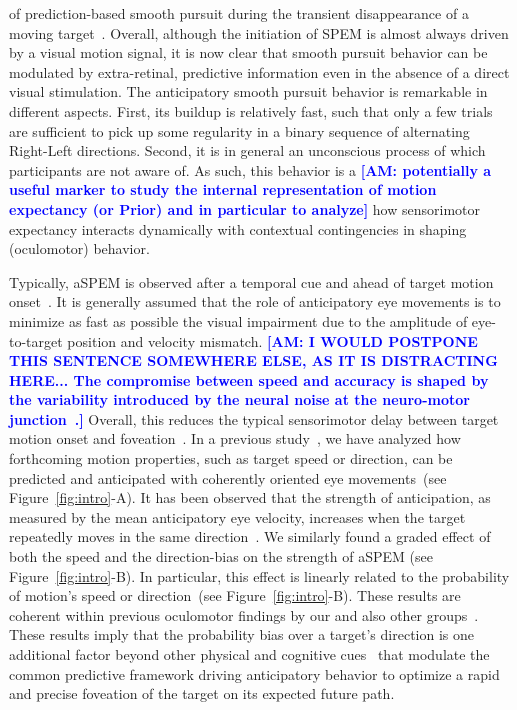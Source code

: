 \documentclass[12pt,english]{article}%
\newcommand{\citep}[1]{\parencite{#1}}
\newcommand{\seeFig}[1]{Figure~\ref{fig:#1}}
\newcommand{\AM}[1]{\textbf{\textcolor{blue}{[AM: #1]}}}
\begin{document}
of prediction-based smooth pursuit during
the transient disappearance of a moving target~\citep{Badler2006,BeckerFuchs1985}.
Overall, although the initiation of SPEM is almost always driven by a visual motion signal, it is now clear that smooth pursuit behavior
can be modulated by extra-retinal, predictive information even in the absence of a direct visual stimulation.
The anticipatory smooth pursuit behavior is remarkable
in different aspects.
First, its buildup is relatively fast, such that only a few trials are sufficient
to pick up some regularity in a binary sequence of alternating Right-Left directions.
Second, it is in general an unconscious process
of which participants are not aware of.
As such, this behavior is a \AM{potentially a useful marker
to study the internal representation of motion expectancy (or Prior) and in particular to analyze} how sensorimotor expectancy interacts dynamically with contextual contingencies in shaping (oculomotor) behavior.

Typically, aSPEM is observed after a temporal cue and
ahead of target motion onset~\citep{Kowler1979a,Kowler1979b, Kowler1984}. %
It is generally assumed that the role of anticipatory eye movements is
to minimize as fast as possible the visual impairment due
to the amplitude of eye-to-target position and velocity mismatch.
\AM{I WOULD POSTPONE THIS SENTENCE SOMEWHERE ELSE, AS IT IS DISTRACTING HERE... The compromise between speed and accuracy is shaped
by the variability introduced by the neural noise
at the neuro-motor junction~\citep{Harris98}.}
Overall, this reduces the typical sensorimotor delay
between target motion onset and foveation~\citep{REFNEEDED}.
In a previous study~\citep{Montagnini2010},
we have analyzed how forthcoming motion properties,
such as target speed or direction, can be
predicted and anticipated with coherently oriented eye movements~(see \seeFig{intro}-A).
It has been observed that the strength of anticipation,
as measured by the mean anticipatory eye velocity,
increases when the target repeatedly moves in the same direction~\citep{Kowler1984, Kowler1989, Heinen2005}.
We similarly found a graded effect of both the speed and the direction-bias
on the strength of aSPEM (see \seeFig{intro}-B).
In particular, this effect is linearly related
to the probability of motion's speed or direction~(see \seeFig{intro}-B).
These results are coherent within previous oculomotor findings
by our and also other groups~\citep{SantosKowler2017}.
These results imply that the probability bias over a target's direction is
one additional factor beyond other physical and cognitive cues~\citep{Kowler2014, SantosKowler2017,Damasse18}
that modulate the common predictive framework
driving anticipatory behavior to optimize a rapid and
precise foveation of the target on its expected future path.
\end{document}
